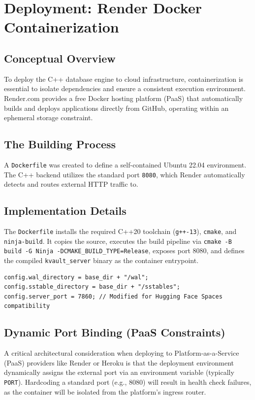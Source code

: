 \documentclass[11pt,a4paper]{article}
\begin{document}
\section{Deployment: Render Docker Containerization}

\subsection{Conceptual Overview}
To deploy the C++ database engine to cloud infrastructure, containerization is essential to isolate dependencies and ensure a consistent execution environment. Render.com provides a free Docker hosting platform (PaaS) that automatically builds and deploys applications directly from GitHub, operating within an ephemeral storage constraint.

\subsection{The Building Process}
A \texttt{Dockerfile} was created to define a self-contained Ubuntu 22.04 environment. The C++ backend utilizes the standard port \texttt{8080}, which Render automatically detects and routes external HTTP traffic to.

\subsection{Implementation Details}
The \texttt{Dockerfile} installs the required C++20 toolchain (\texttt{g++-13}), \texttt{cmake}, and \texttt{ninja-build}. It copies the source, executes the build pipeline via \texttt{cmake -B build -G Ninja -DCMAKE\_BUILD\_TYPE=Release}, exposes port 8080, and defines the compiled \texttt{kvault\_server} binary as the container entrypoint. 

\begin{lstlisting}[style=cpp, caption={Port configuration update in \texttt{main.cpp}}]
config.wal_directory = base_dir + "/wal";
config.sstable_directory = base_dir + "/sstables";
config.server_port = 7860; // Modified for Hugging Face Spaces compatibility
\end{lstlisting}

\subsection{Dynamic Port Binding (PaaS Constraints)}
A critical architectural consideration when deploying to Platform-as-a-Service (PaaS) providers like Render or Heroku is that the deployment environment dynamically assigns the external port via an environment variable (typically \texttt{PORT}). Hardcoding a standard port (e.g., 8080) will result in health check failures, as the container will be isolated from the platform's ingress router.
\end{document}

